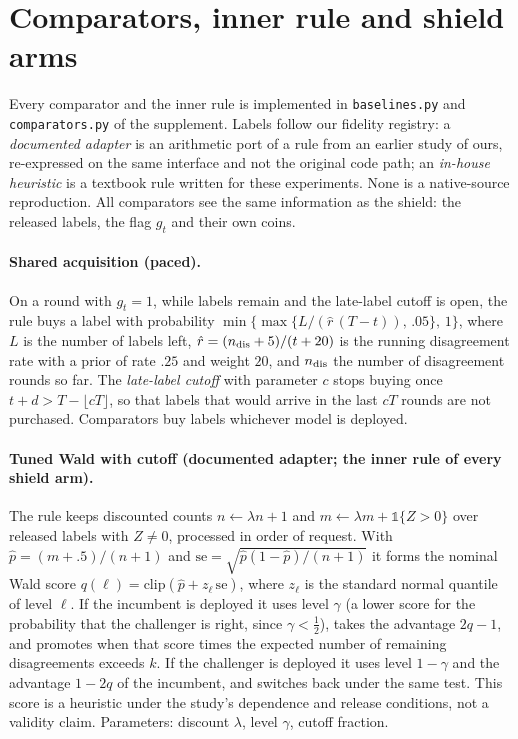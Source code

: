 \documentclass[10pt]{article}
\theoremstyle{plain}
\theoremstyle{definition}
\newcommand{\one}{\mathds{1}}
\begin{document}
\section{Comparators, inner rule and shield arms}\label{app:comp}
Every comparator and the inner rule is implemented in \texttt{baselines.py} and \texttt{comparators.py} of the supplement. Labels follow our fidelity registry: a \emph{documented adapter} is an arithmetic port of a rule from an earlier study of ours, re-expressed on the same interface and not the original code path; an \emph{in-house heuristic} is a textbook rule written for these experiments. None is a native-source reproduction. All comparators see the same information as the shield: the released labels, the flag $g_t$ and their own coins.

\paragraph{Shared acquisition (paced).}
On a round with $g_t=1$, while labels remain and the late-label cutoff is open, the rule buys a label with probability $\min\{\max\{L/(\hat r\,(T-t)),\,.05\},\,1\}$, where $L$ is the number of labels left, $\hat r=(n_{\rm dis}+5)/(t+20)$ is the running disagreement rate with a prior of rate $.25$ and weight $20$, and $n_{\rm dis}$ the number of disagreement rounds so far. The \emph{late-label cutoff} with parameter $c$ stops buying once $t+d>T-\lfloor cT\rfloor$, so that labels that would arrive in the last $cT$ rounds are not purchased. Comparators buy labels whichever model is deployed.

\paragraph{Tuned Wald with cutoff (documented adapter; the inner rule of every shield arm).}
The rule keeps discounted counts $n\leftarrow\lambda n+1$ and $m\leftarrow\lambda m+\one\{Z>0\}$ over released labels with $Z\ne0$, processed in order of request. With $\hat p=(m+.5)/(n+1)$ and $\mathrm{se}=\sqrt{\hat p(1-\hat p)/(n+1)}$ it forms the nominal Wald score $q(\ell)=\mathrm{clip}(\hat p+z_\ell\,\mathrm{se})$, where $z_\ell$ is the standard normal quantile of level $\ell$. If the incumbent is deployed it uses level $\gamma$ (a lower score for the probability that the challenger is right, since $\gamma<\tfrac12$), takes the advantage $2q-1$, and promotes when that score times the expected number of remaining disagreements exceeds $k$. If the challenger is deployed it uses level $1-\gamma$ and the advantage $1-2q$ of the incumbent, and switches back under the same test. This score is a heuristic under the study's dependence and release conditions, not a validity claim. Parameters: discount $\lambda$, level $\gamma$, cutoff fraction.
\end{document}
